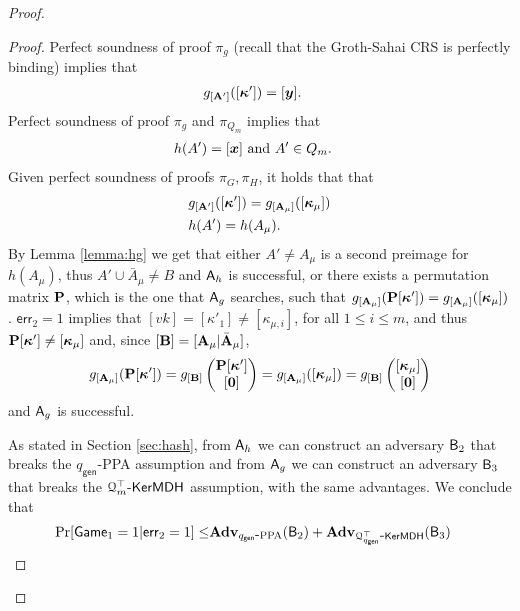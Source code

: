 \begin{proof}
\begin{proof}
Perfect soundness of proof $\pi_g$  (recall that the Groth-Sahai CRS is perfectly binding)  implies that
\begin{align*}
&g_{[\matr{A}']}([\vecb{\kappa}'])=[\vecb{y}]. %
\end{align*}
Perfect soundness of proof $\pi_g$ and $\pi_{Q_m}$ implies that
\begin{align*}
&h(A')=[\vecb{x}]\text{ and } A'\in Q_m.%
\end{align*}
Given perfect soundness of proofs $\pi_G,\pi_H$, it holds that that
\begin{align*}
&g_{[\matr{A}']}([\vecb{\kappa}'])=g_{[\matr{A}_\mu]}([\vecb{\kappa}_\mu])%
\\
&h(A')=h(A_\mu). %
\end{align*}
By Lemma \ref{lemma:hg} we get that either $A'\neq {A}_\mu$ is a second preimage for $h(A_\mu)$, thus $A'\cup\bar{A}_\mu\neq B$ and $\mathsf{A}_h$ is successful, or there exists a permutation matrix $\mathbf{{P}}$, which is the one that $\mathsf{A}_g$ searches, such that $g_{[\mathbf{{A}}_\mu]}(\mathbf{{P}}[{\boldsymbol{\kappa}}'])=g_{[\mathbf{{A}}_\mu]}([{\boldsymbol{\kappa}}_\mu])$. $\mathsf{err}_2=1$ implies that $[vk]=[\kappa'_1]\neq[\kappa_{\mu,i}]$, for all $1\leq i\leq m$, and thus $\mathbf{{P}}[{\boldsymbol{\kappa}}']\neq [{\boldsymbol{\kappa}}_\mu]$ and, since $[\mathbf{{B}}]=[\mathbf{{A}}_\mu|\bar{\mathbf{{A}}}_\mu]$,
$$
g_{[\mathbf{{A}}_\mu]}(\mathbf{{P}}[{\boldsymbol{\kappa}}'])=
g_{[\mathbf{{B}}]}\left(\begin{matrix}
	{\mathbf{{P}}[{\boldsymbol{\kappa}}']}\\
	{[{\boldsymbol{0}}]}\end{matrix}\right)
=
g_{[\mathbf{{A}}_\mu]}([{\boldsymbol{\kappa}}_\mu])
=
g_{[\mathbf{{B}}]}\left(\begin{matrix}
	{[{\boldsymbol{\kappa}}_\mu]}\\
	{[{\boldsymbol{0}}]}\end{matrix}\right)
$$ 
and $\mathsf{A}_g$ is successful.

As stated in Section \ref{sec:hash}, from $\mathsf{A}_h$ we can construct an adversary $\mathsf{B}_2$ that breaks the $q_\mathsf{gen}$-PPA assumption and from $\mathsf{A}_g$ we can construct an adversary $\mathsf{B}_3$ that breaks the $\mathcal{Q}^\top_m\mbox{-}\mathsf{KerMDH}$ assumption, with the same advantages. We conclude that 
\begin{align*}
\Pr[\mathsf{Game}_1=1|\mathsf{err}_2=1] \leq & \mathbf{Adv}_{{q_\mathsf{gen}}\mbox{-}\mathrm{PPA}}(\mathsf{B}_2)+\mathbf{Adv}_{\mathcal{Q}^\top_{q_\mathsf{gen}}\mbox{-}\mathsf{KerMDH}}(\mathsf{B}_3)
\end{align*}
\end{proof}


\end{proof}
